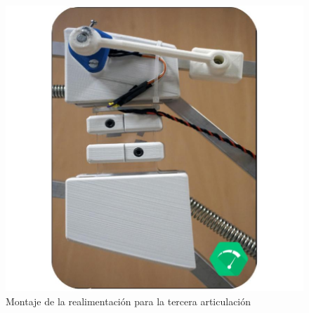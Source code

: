     \begin{minipage}{0.47\textwidth}\raggedright
        \begin{figure}[H]
            \centering
            \includegraphics[width=1.15\textwidth]{figuras/Imagenes_Electronica/foto_brazo_2.jpg}
            \caption{Montaje de la realimentación para la tercera articulación}
            \label{fig:Mecanica:realimentacion_2}
        \end{figure}
    \end{minipage}

